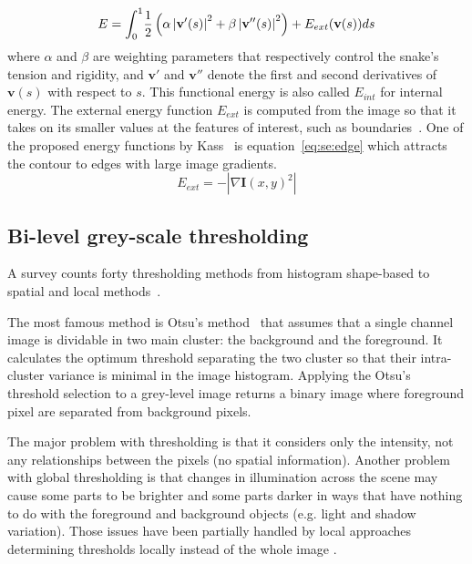 \begin{equation}\label{eq:se:energy1}
  E = \int_0^1 \! \frac{1}{2} \left( \alpha \left|\mathbf{v}'(s) \right|^2 + \beta \left| \mathbf{v}''(s) \right|^2 \right) + E_{ext}(\mathbf{v}(s))ds\\
\end{equation}
where $\alpha$ and $\beta$ are weighting parameters that respectively control the snake's tension and rigidity, and $\mathbf{v}'$ and $\mathbf{v}''$ denote the first and second derivatives of $\mathbf{v}(s)$ with respect to $s$. This functional energy is also called $E_{int}$ for internal energy.
The external energy function $E_{ext}$ is computed from the image so that it takes on its smaller values at the features of interest, such as boundaries~\cite{Xu1998}.
One of the proposed energy functions by Kass~\cite{Kass1988} is equation~\ref{eq:se:edge} which attracts the contour to edges with large image gradients. 
\begin{equation}\label{eq:se:edge}
  E_{ext} = -|\nabla \mathbf{I}(x,y)^2|
\end{equation}


\subsection{Bi-level grey-scale thresholding} %
\label{sub:ap:bi_threshold}
A survey counts forty thresholding methods from histogram shape-based to spatial and local methods~\cite{sezgin2004survey}.
 
The most famous method is Otsu's method~\cite{otsu79} that assumes that a single channel image is dividable in two main cluster: the background and the foreground.
It calculates the optimum threshold separating the two cluster so that their intra-cluster variance is minimal in the image histogram.
Applying the Otsu's threshold selection to a grey-level image returns a binary image where foreground pixel are separated from background pixels.

The major problem with thresholding is that it considers only the intensity, not any relationships between the pixels (no spatial information).
Another problem with global thresholding is that changes in illumination across the scene may cause some parts to be brighter and some parts darker in ways that have nothing to do with the foreground and background objects (e.g. light and shadow variation).
Those issues have been partially handled by local approaches determining thresholds locally instead of the whole image \modif{[REF???]}.


